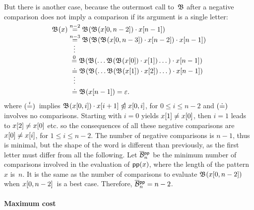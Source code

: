 But there is another case,
because the outermost call to~\(\mathfrak{B}\) after a negative
comparison does not imply a comparison if its argument is a single
letter:
\begin{align*}
\mathfrak{B}^{}(x)
&\mathrel{\stackrel{\smash{n-2}}{=}} \mathfrak{B}^{}(\mathfrak{B}^{}({x}[{0,n-2}]) \cdot {x}[{n-1}])\\
&\mathrel{\stackrel{\smash{n-3}}{=}} \mathfrak{B}^{}(\mathfrak{B}^{}(\mathfrak{B}^{}({x}[{0,n-3}]) \cdot
    {x}[{n-2}]) \cdot {x}[{n-1}])\\
&\;\;\;\smash{\vdots}\\
&\;\mathrel{\stackrel{\smash[t]{0}}{=}}
  \mathfrak{B}^{}(\mathfrak{B}^{}(\ldots \mathfrak{B}^{}(\mathfrak{B}^{}({x}[{0}]) \cdot
        {x}[{1}]) \dots) \cdot {x}[{n-1}])\\
&\,\,\doteq
  \mathfrak{B}^{}(\mathfrak{B}^{}(\ldots \mathfrak{B}^{}(\mathfrak{B}^{}({x}[{1}]) \cdot
            {x}[{2}]) \dots) \cdot {x}[{n-1}])\\
&\;\;\;\smash{\vdots}\\
&\,\,\doteq \mathfrak{B}^{}({x}[{n-1}]) = \varepsilon.
\end{align*}
where \((\smash{\mathrel{\stackrel{\smash{i}}{=}}})\)~implies \(\mathfrak{B}^{}({x}[{0,i}]) \cdot
{x}[{i+1}] \mathrel{\ntrianglelefteqslant} {x}[{0,i}]\), for \(0 \leqslant i \leqslant
n-2\) and \((\smash{\doteq})\) involves no comparisons. Starting with
\(i=0\) yields \({x}[{1}] \neq {x}[{0}]\), then \(i=1\) leads to
\({x}[{2}] \neq {x}[{0}]\) etc. so the consequences of all these
negative comparisons are \({x}[{0}] \neq {x}[{i}]\), for \(1
\leqslant i \leqslant n-2\). The number of negative comparisons is
\(n-1\), thus is minimal, but the shape of the word is different than
previously, as the first letter must differ from all the
following. Let \(\OB{\fun{pp}}{n}\) be
the minimum number of comparisons involved in the evaluation of
\(\textsf{pp}(x)\), where the length of the
pattern~\(x\) is~\(n\). It is the same as the number of comparisons to
evaluate \(\mathfrak{B}^{}({x}[{0,n-2}])\) when \({x}[{0,n-2}]\)~is a
best case. Therefore,
\(\OB{\fun{pp}}{n} = n - 2\).

\paragraph{Maximum cost}

